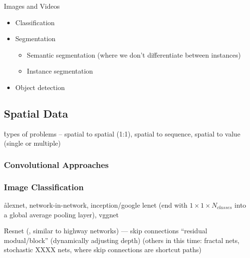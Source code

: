 



Images and Videos
\begin{itemize}[noitemsep,topsep=0pt]
	\item Classification
	\item Segmentation
	\begin{itemize}[noitemsep,topsep=0pt]
		\item Semantic segmentation (where we don't differentiate between instances)
		\item Instance segmentation
	\end{itemize}
	\item Object detection
\end{itemize}


\subsection{Spatial Data}

\r{types of problems -- spatial to spatial (1:1), spatial to sequence, spatial to value (single or multiple)}

\subsubsection{Convolutional Approaches}



\subsubsection{Image Classification}
\r{alexnet, network-in-network, inception/google lenet (end with $1 \times 1 \times N_{classes}$ into a global average pooling layer), vggnet}



\r{Resnet (, similar to highway networks) --- skip connections ``residual modual/block'' (dynamically adjusting depth) (others in this time: fractal nets, stochastic XXXX nets, where skip connections are shortcut paths)}

